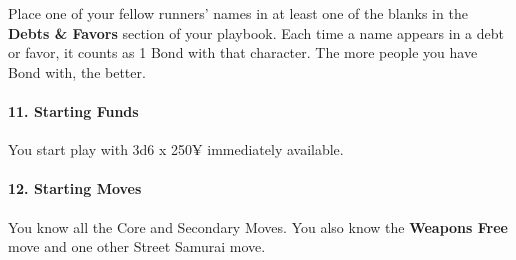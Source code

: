 \begin{multicols}{3}
Place one of your fellow runners’ names in at
least one of the blanks in the \textbf{Debts \& Favors}
section of your playbook. Each time a name
appears in a debt or favor, it counts as 1 Bond
with that character. The more people you have
Bond with, the better.

\paragraph{11.  Starting Funds}

You start play with 3d6 x 250¥ immediately
available.

\paragraph{12.  Starting Moves}

You know all the Core and Secondary Moves.
You also know the \textbf{Weapons Free} move and
one other Street Samurai move.

\end{multicols}

\newpage



